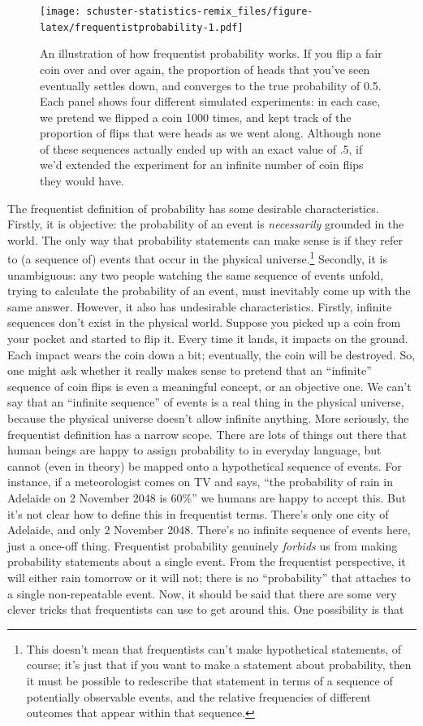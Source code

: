 \documentclass[
]{book}
\begin{document}
\begin{figure}
\centering
\texttt{[image: schuster-statistics-remix\_files/figure-latex/frequentistprobability-1.pdf]}
\caption{\label{fig:frequentistprobability}An illustration of how frequentist probability works. If you flip a fair coin over and over again, the proportion of heads that you've seen eventually settles down, and converges to the true probability of 0.5. Each panel shows four different simulated experiments: in each case, we pretend we flipped a coin 1000 times, and kept track of the proportion of flips that were heads as we went along. Although none of these sequences actually ended up with an exact value of .5, if we'd extended the experiment for an infinite number of coin flips they would have.}
\end{figure}

The frequentist definition of probability has some desirable characteristics. Firstly, it is objective: the probability of an event is \emph{necessarily} grounded in the world. The only way that probability statements can make sense is if they refer to (a sequence of) events that occur in the physical universe.\footnote{This doesn't mean that frequentists can't make hypothetical statements, of course; it's just that if you want to make a statement about probability, then it must be possible to redescribe that statement in terms of a sequence of potentially observable events, and the relative frequencies of different outcomes that appear within that sequence.} Secondly, it is unambiguous: any two people watching the same sequence of events unfold, trying to calculate the probability of an event, must inevitably come up with the same answer. However, it also has undesirable characteristics. Firstly, infinite sequences don't exist in the physical world. Suppose you picked up a coin from your pocket and started to flip it. Every time it lands, it impacts on the ground. Each impact wears the coin down a bit; eventually, the coin will be destroyed. So, one might ask whether it really makes sense to pretend that an ``infinite'' sequence of coin flips is even a meaningful concept, or an objective one. We can't say that an ``infinite sequence'' of events is a real thing in the physical universe, because the physical universe doesn't allow infinite anything. More seriously, the frequentist definition has a narrow scope. There are lots of things out there that human beings are happy to assign probability to in everyday language, but cannot (even in theory) be mapped onto a hypothetical sequence of events. For instance, if a meteorologist comes on TV and says, ``the probability of rain in Adelaide on 2 November 2048 is 60\%'' we humans are happy to accept this. But it's not clear how to define this in frequentist terms. There's only one city of Adelaide, and only 2 November 2048. There's no infinite sequence of events here, just a once-off thing. Frequentist probability genuinely \emph{forbids} us from making probability statements about a single event. From the frequentist perspective, it will either rain tomorrow or it will not; there is no ``probability'' that attaches to a single non-repeatable event. Now, it should be said that there are some very clever tricks that frequentists can use to get around this. One possibility is that 
\end{document}
